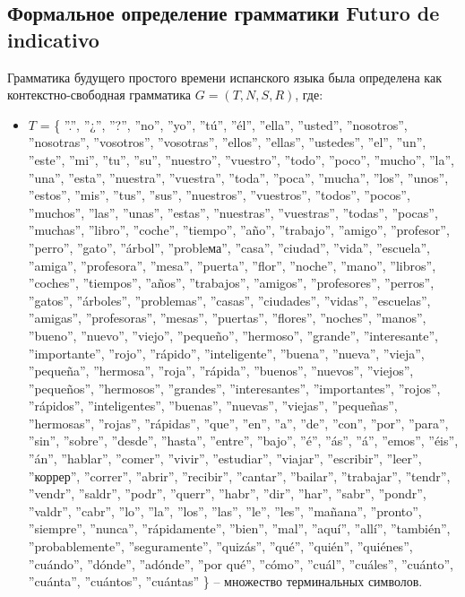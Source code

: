 \documentclass[a4paper,final]{article}
\begin{document}
\subsection{Формальное определение грамматики Futuro de indicativo}
Грамматика будущего простого времени испанского языка была определена как контекстно-свободная грамматика $G = (T, N, S, R)$, где:
\begin{itemize}
    \item $T$ = \{ ''.'', ''¿'', ''?'', ''no'', ''yo'', ''tú'', ''él'', ''ella'', ''usted'', ''nosotros'', ''nosotras'', ''vosotros'', ''vosotras'', ''ellos'', ''ellas'', ''ustedes'', ''el'', ''un'', ''este'', ''mi'', ''tu'', ''su'', ''nuestro'', ''vuestro'', ''todo'', ''poco'', ''mucho'', ''la'', ''una'', ''esta'', ''nuestra'', ''vuestra'', ''toda'', ''poca'', ''mucha'', ''los'', ''unos'', ''estos'', ''mis'', ''tus'', ''sus'', ''nuestros'', ''vuestros'', ''todos'', ''pocos'', ''muchos'', ''las'', ''unas'', ''estas'', ''nuestras'', ''vuestras'', ''todas'', ''pocas'', ''muchas'', ''libro'', ''coche'', ''tiempo'', ''año'', ''trabajo'', ''amigo'', ''profesor'', ''perro'', ''gato'', ''árbol'', ''probleма'', ''casa'', ''ciudad'', ''vida'', ''escuela'', ''amiga'', ''profesora'', ''mesa'', ''puerta'', ''flor'', ''noche'', ''mano'', ''libros'', ''coches'', ''tiempos'', ''años'', ''trabajos'', ''amigos'', ''profesores'', ''perros'', ''gatos'', ''árboles'', ''problemas'', ''casas'', ''ciudades'', ''vidas'', ''escuelas'', ''amigas'', ''profesoras'', ''mesas'', ''puertas'', ''flores'', ''noches'', ''manos'', ''bueno'', ''nuevo'', ''viejo'', ''pequeño'', ''hermoso'', ''grande'', ''interesante'', ''importante'', ''rojo'', ''rápido'', ''inteligente'', ''buena'', ''nueva'', ''vieja'', ''pequeña'', ''hermosa'', ''roja'', ''rápida'', ''buenos'', ''nuevos'', ''viejos'', ''pequeños'', ''hermosos'', ''grandes'', ''interesantes'', ''importantes'', ''rojos'', ''rápidos'', ''inteligentes'', ''buenas'', ''nuevas'', ''viejas'', ''pequeñas'', ''hermosas'', ''rojas'', ''rápidas'', ''que'', ''en'', ''a'', ''de'', ''con'', ''por'', ''para'', ''sin'', ''sobre'', ''desde'', ''hasta'', ''entre'', ''bajo'', ''é'', ''ás'', ''á'', ''emos'', ''éis'', ''án'', ''hablar'', ''comer'', ''vivir'', ''estudiar'', ''viajar'', ''escribir'', ''leer'', ''коррер'', ''correr'', ''abrir'', ''recibir'', ''cantar'', ''bailar'', ''trabajar'', ''tendr'', ''vendr'', ''saldr'', ''podr'', ''querr'', ''habr'', ''dir'', ''har'', ''sabr'', ''pondr'', ''valdr'', ''cabr'', ''lo'', ''la'', ''los'', ''las'', ''le'', ''les'', ''mañana'', ''pronto'', ''siempre'', ''nunca'', ''rápidamente'', ''bien'', ''mal'', ''aquí'', ''allí'', ''también'', ''probablemente'', ''seguramente'', ''quizás'', ''qué'', ''quién'', ''quiénes'', ''cuándo'', ''dónde'', ''adónde'', ''por qué'', ''cómo'', ''cuál'', ''cuáles'', ''cuánto'', ''cuánta'', ''cuántos'', ''cuántas'' \} -- множество терминальных символов.

\end{itemize}
\end{document}
